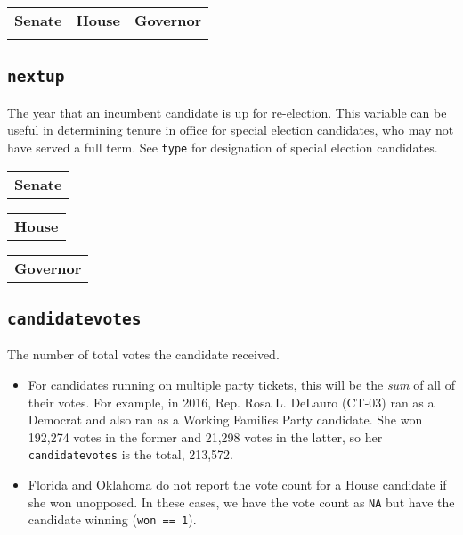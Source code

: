 \documentclass[12pt]{article}
\begin{document}
    \begin{tabularx}{\linewidth}{CCC}
    \textbf{Senate} & \textbf{House} & \textbf{Governor}\\
     &  & 
    \end{tabularx}


\FloatBarrier


\subsection*{\texttt{nextup}}

The year that an incumbent candidate is up for re-election. This variable can be useful in determining tenure in office for special election candidates, who may not have served a full term. See \texttt{type} for designation of special election candidates. 		

\begin{tabularx}{\linewidth}{C}
\textbf{Senate}\\

\end{tabularx}

\begin{tabularx}{\linewidth}{C}
\textbf{House}\\
 
\end{tabularx}

\begin{tabularx}{\linewidth}{C}
\textbf{Governor}\\

\end{tabularx}

\FloatBarrier

\subsection*{\texttt{candidatevotes}} 

The number of total votes the candidate received. 
\begin{itemize}
\item For candidates running on multiple party tickets, this will be the \emph{sum} of all of their votes.  For example, in 2016, Rep. Rosa L. DeLauro (CT-03) ran as a Democrat and also ran as a Working Families Party candidate. She won 192,274 votes in the former and 21,298 votes in the latter, so her \texttt{candidatevotes} is the total, 213,572.
\item  Florida and Oklahoma do not report the vote count for a House candidate if she won unopposed. In these cases, we have the vote count as \texttt{NA} but have the candidate winning (\texttt{won == 1}).
\end{itemize}
\end{document}
